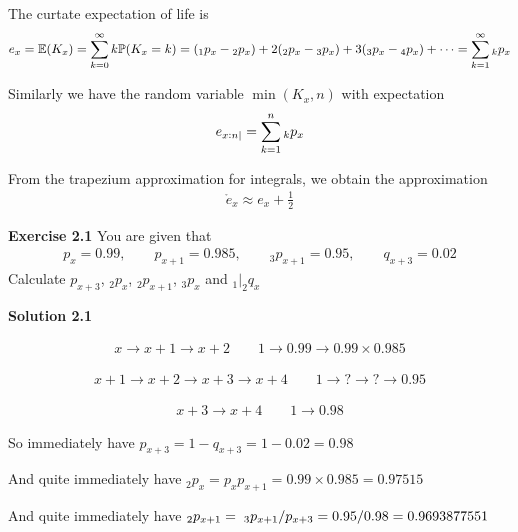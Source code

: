 \documentclass[hidelinks, 12pt]{article}
\theoremstyle{mydefstyle}
\theoremstyle{mythmstyle}
\begin{document}
The curtate expectation of life is
\begin{gather*}
e_x = \mathbb{E}(K_x) 
= \sum_{k=0}^{\infty} k \mathbb{P}(K_x = k)
= (_1p_x -  \hspace{0mm}_2p_x) + 2( \hspace{0mm}_2p_x -  \hspace{0mm}_3p_x) + 3( \hspace{0mm}_3p_x -  \hspace{0mm}_4p_x) + \dots
= \sum_{k=1}^{\infty}  \hspace{0mm}_kp_x
\end{gather*}

Similarly we have the random variable $\min(K_x, n)$ with expectation
\begin{gather*}
e_{x:n|} = \sum_{k=1}^n  \hspace{0mm}_kp_x
\end{gather*}

From the trapezium approximation for integrals, we obtain the approximation
\begin{gather*}
\mathring{e}_x \approx e_x + \frac{1}{2}
\end{gather*}

\textbf{Exercise 2.1} You are given that
\begin{gather*}
p_x = 0.99, \qquad p_{x+1} = 0.985, \qquad _3p_{x+1} = 0.95, \qquad q_{x+3} = 0.02
\end{gather*}
Calculate $p_{x+3}$, $_2p_x$, $_2p_{x+1}$, $_3p_x$ and $_1\vert_2q_x$

\textbf{Solution 2.1}

\begin{gather*}
x \to x+1 \to x+2 \qquad 1 \to 0.99 \to 0.99 \times 0.985 
\end{gather*}

\begin{gather*}
x+1 \to x+2 \to x+3 \to x+4 \qquad 1 \to ? \to ? \to 0.95
\end{gather*}

\begin{gather*}
x+3 \to x+4 \qquad 1 \to 0.98
\end{gather*}

So immediately have $p_{x+3} = 1 - q_{x+3} = 1 - 0.02 = 0.98$

And quite immediately have $_2p_x = p_x p_{x+1} = 0.99 \times 0.985 = 0.97515$

And quite immediately have $_2p_{x+1} = \hspace{1mm}_3p_{x+1} / p_{x+3} = 0.95 / 0.98 = 0.9693877551$
\end{document}
